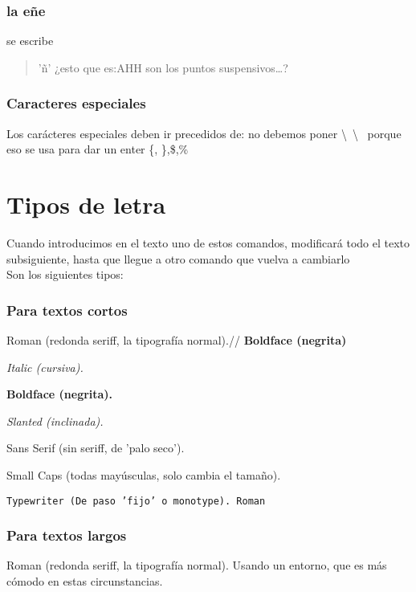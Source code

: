 \documentclass[a4paper,11pt]{article}
\begin{document}
\section{la e\~ne}
se escribe \begin{quote}'\~n' ¿esto que es:AHH son los puntos suspensivos\ldots?
\end{quote}

\section{Caracteres especiales}
\label{sec:caracteres especiales}
Los carácteres especiales deben ir precedidos de:  no debemos poner \textbackslash\ \textbackslash\ %
porque eso se usa para dar un enter
\{, \},\$,\% %
\part{Tipos de letra}
Cuando introducimos en el texto uno de estos comandos, modificará todo el texto subsiguiente, hasta que llegue a otro comando que vuelva a cambiarlo\\
Son los siguientes tipos:\\
\section{Para textos cortos}


{\rm Roman} (redonda seriff, la tipografía normal).//
\bf Boldface (negrita)

\em Italic (cursiva).

\bf Boldface (negrita).

\sl Slanted (inclinada).

\sf Sans Serif (sin seriff, de 'palo seco').

\sc Small Caps (todas mayúsculas, solo cambia el tamaño).

\tt Typewriter (De paso 'fijo'  o monotype).%
\rm Roman%
 \section{Para textos largos}

 \begin{rm}
 Roman (redonda seriff, la tipografía normal). Usando un entorno, que es más cómodo en estas circunstancias.
 \end{rm} \\
\end{document}
